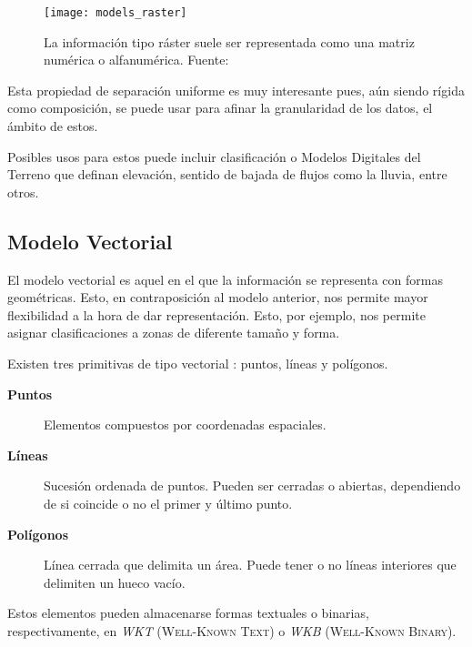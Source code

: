 	\begin{figure}[htbp]
		\centering
		\texttt{[image: models\_raster]}		
		\caption[Representación de datos geográficos de tipo ráster]{La información tipo ráster suele ser representada como una matriz numérica o alfanumérica. {Fuente: \autocite[86]{volaya}}}
	\end{figure}
	
	Esta propiedad de separación uniforme es muy interesante pues, aún siendo rígida como composición, se puede usar para afinar la granularidad de los datos, el ámbito de estos.
	
	Posibles usos para estos puede incluir clasificación o Modelos Digitales del Terreno que definan elevación, sentido de bajada de flujos como la lluvia, entre otros.

\subsection{Modelo Vectorial}
	El modelo vectorial es aquel en el que la información se representa con formas geométricas. Esto, en contraposición al modelo anterior, nos permite mayor flexibilidad a la hora de dar representación. Esto, por ejemplo, nos permite asignar clasificaciones a zonas de diferente tamaño y forma.
	
	Existen tres primitivas de tipo vectorial \autocite[92-95]{volaya}: puntos, líneas y polígonos.

\begin{description}
	\item[\textbf{Puntos}] Elementos compuestos por coordenadas espaciales.
	\item[\textbf{Líneas}] Sucesión ordenada de puntos. Pueden ser cerradas o abiertas, dependiendo de si coincide o no el primer y último punto.
	\item[\textbf{Polígonos}] Línea cerrada que delimita un área. Puede tener o no líneas interiores que delimiten un hueco vacío.
\end{description}

Estos elementos pueden almacenarse formas textuales o binarias, respectivamente, en \textit{WKT} (\textsc{Well-Known Text}) o \textit{WKB} (\textsc{Well-Known Binary}).

